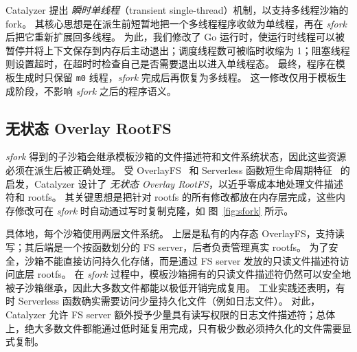 \documentclass[letterpaper,twocolumn,10pt]{article}
\newcommand{\sys}{Catalyzer}
\newcommand{\figref}[1]{图~\ref{#1}}
\begin{document}
\sys{} 提出 \emph{瞬时单线程}（transient single-thread）机制，以支持多线程沙箱的 fork。
其核心思想是在派生前短暂地把一个多线程程序收敛为单线程，再在 \emph{sfork} 后把它重新扩展回多线程。
为此，我们修改了 Go 运行时，使运行时线程可以被暂停并将上下文保存到内存后主动退出；调度线程数可被临时收缩为 1；阻塞线程则设置超时，在超时时检查自己是否需要退出以进入单线程态。
最终，程序在模板生成时只保留 \texttt{m0} 线程，\emph{sfork} 完成后再恢复为多线程。
这一修改仅用于模板生成阶段，不影响 \emph{sfork} 之后的程序语义。

\subsection{无状态 Overlay RootFS}\label{sec:overlay-rootfs}
\emph{sfork} 得到的子沙箱会继承模板沙箱的文件描述符和文件系统状态，因此这些资源必须在派生后被正确处理。
受 OverlayFS~\cite{r13} 和 Serverless 函数短生命周期特征~\cite{r27,r28} 的启发，\sys{} 设计了 \emph{无状态 Overlay RootFS}，以近乎零成本地处理文件描述符和 rootfs。
其关键思想是把针对 rootfs 的所有修改都放在内存层完成，这些内存修改可在 \emph{sfork} 时自动通过写时复制克隆，如 \figref{fig:sfork} 所示。

具体地，每个沙箱使用两层文件系统。
上层是私有的内存态 OverlayFS，支持读写；其后端是一个按函数划分的 FS server，后者负责管理真实 rootfs。
为了安全，沙箱不能直接访问持久化存储，而是通过 FS server 发放的只读文件描述符访问底层 rootfs。
在 \emph{sfork} 过程中，模板沙箱拥有的只读文件描述符仍然可以安全地被子沙箱继承，因此大多数文件都能以极低开销完成复用。
工业实践还表明，有时 Serverless 函数确实需要访问少量持久化文件（例如日志文件）。
对此，\sys{} 允许 FS server 额外授予少量具有读写权限的日志文件描述符；总体上，绝大多数文件都能通过低时延复用完成，只有极少数必须持久化的文件需要显式复制。
\end{document}
